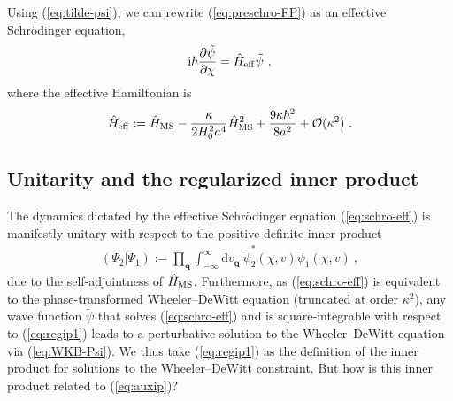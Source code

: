 \documentclass[12pt]{iopart}
\def\eq#1{\begin{equation}\begin{aligned}#1\end{aligned}\end{equation}}
\def\eref#1{(\ref{eq:#1})}
\def\D{\mathrm{d}}
\def\I{\mathrm{i}}
\def\del#1#2{\frac{\partial#1}{\partial#2}}
\def\Ob{\mathcal{O}}
\def\q{\mathbf{q}}
\begin{document}
Using \eref{tilde-psi}, we can rewrite \eref{preschro-FP} as an effective Schr\"odinger equation,
\eq{\label{eq:schro-eff}
\I\hbar\del{\tilde{\psi}}{\chi} = \hat{H}_{\rm eff}\tilde{\psi} \ ,
}
where the effective Hamiltonian is
\eq{\label{eq:H-eff}
\hat{H}_{\rm eff} := \hat{H}_{\rm MS}-\frac{\kappa}{2H_0^2a^4}\hat{H}^2_{\rm MS}+\frac{9\kappa\hbar^2}{8a^2}+\Ob(\kappa^2) \ .
}

\subsection{\label{sec:regip}Unitarity and the regularized inner product}
The dynamics dictated by the effective Schr\"odinger equation \eref{schro-eff} is manifestly unitary with respect to the positive-definite inner product
\eq{\label{eq:regip1}
(\Psi_2|\Psi_1) := \prod_{\q}\int_{-\infty}^{\infty}\D v_{\q}\ \tilde{\psi}_2^*(\chi,v)\tilde{\psi}_1(\chi,v) \ ,
}
due to the self-adjointness of $\hat{H}_{\rm MS}$. Furthermore, as \eref{schro-eff} is equivalent to the phase-transformed Wheeler--DeWitt equation (truncated at order $\kappa^2$), any wave function $\tilde{\psi}$ that solves \eref{schro-eff} and is square-integrable with respect to \eref{regip1} leads to a perturbative solution to the Wheeler--DeWitt equation via \eref{WKB-Psi}. We thus take \eref{regip1} as the definition of the inner product for solutions to the Wheeler--DeWitt constraint. But how is this inner product related to \eref{auxip}?
\end{document}
